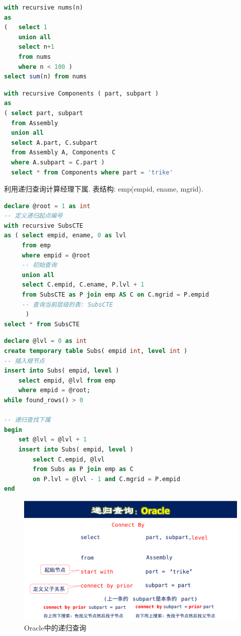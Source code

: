 \begin{lstlisting}[language=SQL]
with recursive nums(n)
as
(   select 1
    union all
    select n+1
    from nums
    where n < 100 )
select sum(n) from nums
\end{lstlisting}

\begin{lstlisting}[language=SQL]
with recursive Components ( part, subpart )
as
( select part, subpart
  from Assembly
  union all
  select A.part, C.subpart
  from Assembly A, Components C
  where A.subpart = C.part )
  select * from Components where part = 'trike'
\end{lstlisting}

\begin{example}
    利用递归查询计算经理下属. 表结构: emp(empid, ename, mgrid).
\end{example}

\begin{lstlisting}[language=SQL]
declare @root = 1 as int
-- 定义递归起点编号
with recursive SubsCTE
as ( select empid, ename, 0 as lvl
     from emp
     where empid = @root
     -- 初始查询
     union all
     select C.empid, C.ename, P.lvl + 1
     from SubsCTE as P join emp AS C on C.mgrid = P.empid
     -- 查询当前层级的表: SubsCTE
      )
select * from SubsCTE    
\end{lstlisting}

\begin{lstlisting}[language=SQL]
declare @lvl = 0 as int
create temporary table Subs( empid int, level int )
-- 插入根节点
insert into Subs( empid, level )
    select empid, @lvl from emp
    where empid = @root;
while found_rows() > 0

-- 递归查找下属
begin
    set @lvl = @lvl + 1
    insert into Subs( empid, level )
        select C.empid, @lvl
        from Subs as P join emp as C
        on P.lvl = @lvl - 1 and C.mgrid = P.empid
end    
\end{lstlisting}

\begin{figure}[H]
    \centering
    \includegraphics[width=.6\textwidth]{./figure/递归查询.pdf}
    \caption{Oracle中的递归查询}
\end{figure}

